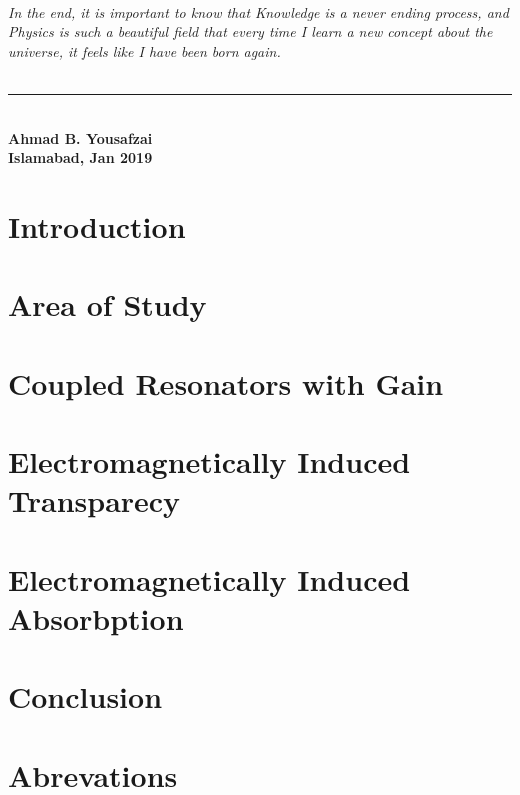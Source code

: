 \documentclass[12pt,twoside]{report}
\begin{document}
\subparagraph*{ \normalfont	In the end, it is important to know that Knowledge is a never ending process, and Physics is such a beautiful field that every time I learn a new concept about the universe, it feels like I have been born again.}
\begin{flushleft}
\noindent\rule{5cm}{0.5pt}\\
\textbf{\small Ahmad B. Yousafzai}\\
\textbf{\small Islamabad, Jan 2019}
\end{flushleft}


\begin{scriptsize}
\small \tableofcontents
\end{scriptsize}
\listoffigures
\newpage
{}
\fancyhead[RO,LE]{}
\fancyfoot[LE,RO]{\thepage}
\renewcommand{\footrulewidth}{0.5pt}

\pagestyle{fancy}

\chapter{Introduction}

 
\chapter{Area of Study}

 
\chapter{Coupled Resonators with Gain}

 
\chapter{Electromagnetically Induced Transparecy}

 
\chapter{Electromagnetically Induced Absorbption}


\chapter{Conclusion}

\appendix
\chapter{Abrevations}

\end{document}
